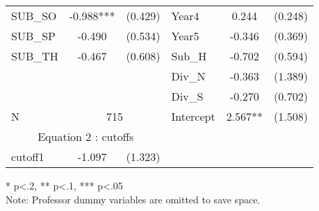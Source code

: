 \begin{table}[H]
\begin{threeparttable}
\begin{tabular}{l c c|l c c }
    SUB\_SO                                      & -0.988***                 & (0.429)              & Year4               & 0.244                  & (0.248)              \\
    SUB\_SP                                      & -0.490                    & (0.534)              & Year5               & -0.346                 & (0.369)              \\
    SUB\_TH                                      & -0.467                    & (0.608)              & Sub\_H              & -0.702                 & (0.594)              \\
                                                 &                           &                      & Div\_N              & -0.363                 & (1.389)              \\
                                                 &                           &                      & Div\_S              & -0.270                 & (0.702)              \\
    \cline{1-3}
      N                                          & \multicolumn{2}{|c|}{715} & Intercept            & 2.567**             & (1.508)                                       \\
    \cline{1-3}
    \multicolumn{3}{c|}{Equation 2 : cutoffs}    &                           &                      &                                                                     \\
    \cline{1-3}
    cutoff1                                      & -1.097                    & (1.323)              &                     &                        &                      \\
    \hline 
    \hline
  \end{tabular}
  \begin{tablenotes}
  \item{* p<.2, ** p<.1, *** p<.05 \\ Note: Professor dummy variables are omitted to save space.}
  \end{tablenotes}
  \end{threeparttable}
\end{table}

\clearpage{}

\newpage{}

